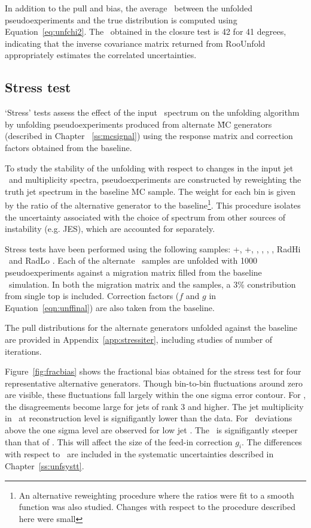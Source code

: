 In addition to the pull and bias, the average \chisq\ between the unfolded pseudoexperiments and the true distribution is computed using Equation~\ref{eq:unfchi2}.  The \chisq\ obtained in the closure test is 42 for 41 degrees, indicating that the
inverse covariance matrix returned from RooUnfold appropriately estimates the correlated uncertainties. 

\subsection{Stress test}
\label{ss:stress}
`Stress' tests assess the effect of the input \pt\ spectrum on the unfolding algorithm by unfolding pseudoexperiments produced from alternate \ttbar\~MC generators (described in Chapter ~\ref{ss:mcsignal}) using the response matrix and correction factors
obtained from the baseline. 

To study the stability of the unfolding with respect to changes in the input jet \pt\ and multiplicity spectra, pseudoexperiments are constructed by reweighting the truth jet spectrum in the baseline MC sample. The weight for each bin is given by the ratio of the alternative generator to the baseline\footnote{An alternative reweighting procedure where the ratios were fit to a smooth function was also studied. Changes with respect to the procedure described here were small}. This procedure isolates the uncertainty associated with the choice of spectrum from other sources of instability (e.g. JES), which are accounted for separately. %

Stress tests have been performed using the following samples: \pow+\py, \pow+\hw, \madpy, \mcnlohw, \peight, \hdamp, RadHi \madpy\ and RadLo \madpy. Each of the alternate \ttbar\ samples are unfolded with 1000 pseudoexperiments against a migration matrix filled from the baseline \ttbar\ simulation. In both the migration matrix and the samples, a 3\% constribution from single top is included. Correction factors ($f$ and $g$ in Equation~\ref{eqn:unffinal}) are also taken from the baseline.

The pull distributions for the alternate generators unfolded against the baseline are provided in Appendix~\ref{app:stressiter}, including studies of number of iterations.

Figure~\ref{fig:fracbias} shows the fractional bias obtained for the stress test for four representative alternative generators. Though bin-to-bin fluctuations around zero are visible, these fluctuations fall largely within the one sigma error contour. For \mcnlohw, the disagreements become large for jets of rank 3 and higher. The jet multiplicity in \mcnlohw\ at reconstruction level is signifigantly lower than the data. For \madpy\ deviations above the one sigma level are observed for low jet \pt. The \madpy\ is signifigantly steeper than that of \powpy. This will affect the size of the feed-in correction $g_i$. The differences with respect to \madpy\ are included in the systematic uncertainties described in Chapter~\ref{ss:unfsystt}.

